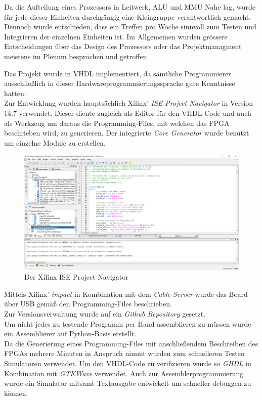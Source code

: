 Da die Aufteilung eines Prozessors in Leitwerk, ALU und MMU Nahe lag, wurde
f\"ur jede dieser Einheiten durchg\"angig eine Kleingruppe verantwortlich
gemacht. Dennoch wurde entschieden, dass ein Treffen pro Woche sinnvoll zum
Testen und Integrieren der einzelnen Einheiten ist. Im Allgemeinen wurden
gr\"ossere Entscheidungen \"uber das Design des Prozessors oder das
Projektmanagment meistens im Plenum besprochen und getroffen.

Das Projekt wurde in VHDL implementiert, da s\"amtliche Programmierer ausschlie{\ss}lich in dieser Hardwareprogrammierungssprache gute Kenntnisse hatten.\\
Zur Entwicklung wurden haupts\"achlich Xilinx' \textit{ISE Project Navigator} in Version 14.7 verwendet. Dieser diente zugleich als Editor f\"ur den VHDL-Code und auch als Werkzeug um daraus die Programming-Files, mit welchen das FPGA beschrieben wird, zu generieren. Der integrierte \textit{Core Generator} wurde benutzt um einzelne Module zu erstellen.\\
\begin{figure}[H]
	\centering
		\includegraphics[width=1.0\textwidth]{ISE.png}
	\caption{Der Xilinx ISE Project Navigator}
	\label{fig:tool}
\end{figure}
Mittels Xilinx' \textit{impact} in Kombination mit dem \textit{Cable-Server} wurde das Board \"uber USB gem\"a{\ss} den Programming-Files beschrieben.\\
Zur Versionsverwaltung wurde auf ein \textit{Github Repository} gesetzt.\\ 
Um nicht jedes zu testende Programm per Hand assemblieren zu m\"ussen wurde ein Assemblierer auf Python-Basis erstellt.\\
Da die Generierung eines Programming-Files mit anschlie{\ss}endem Beschreiben des FPGAs mehrere Minuten in Anspruch nimmt wurden zum schnelleren Testen Simulatoren verwendet. Um den VHDL-Code zu verifizieren wurde so \textit{GHDL} in Kombination mit \textit{GTKWave} verwendet. Auch zur Assemblerprogrammierung wurde ein Simulator mitsamt Textausgabe entwickelt um schneller debuggen zu k\"onnen.
